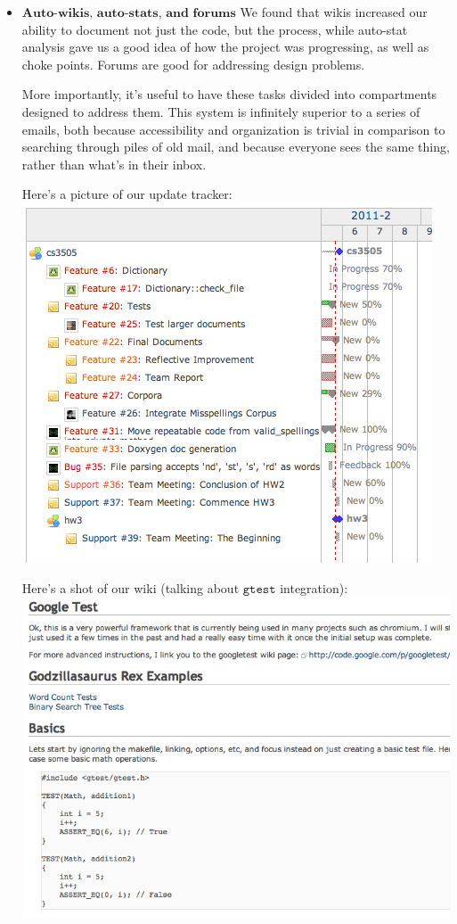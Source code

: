 \documentclass[a4paper]{article}
\begin{document}
\begin{itemize}
	\item $\textbf{Auto-wikis, auto-stats, and forums}$ We found that wikis increased our ability to document not just the code, but the process, while auto-stat analysis gave us a good idea of how the project was progressing, as well as choke points. Forums are good for addressing design problems.
	
	More importantly, it's useful to have these tasks divided into compartments designed to address them. This system is infinitely superior to a series of emails, both because accessibility and organization is trivial in comparison to searching through piles of old mail, and because everyone sees the same thing, rather than what's in their inbox.
	
	Here's a picture of our update tracker:\\
	\includegraphics[scale=0.5]{update_calendar.png}
	
	Here's a shot of our wiki (talking about $\texttt{gtest}$ integration):\\
	\includegraphics[scale=0.4]{wiki.png}
	

\end{itemize}
\end{document}

